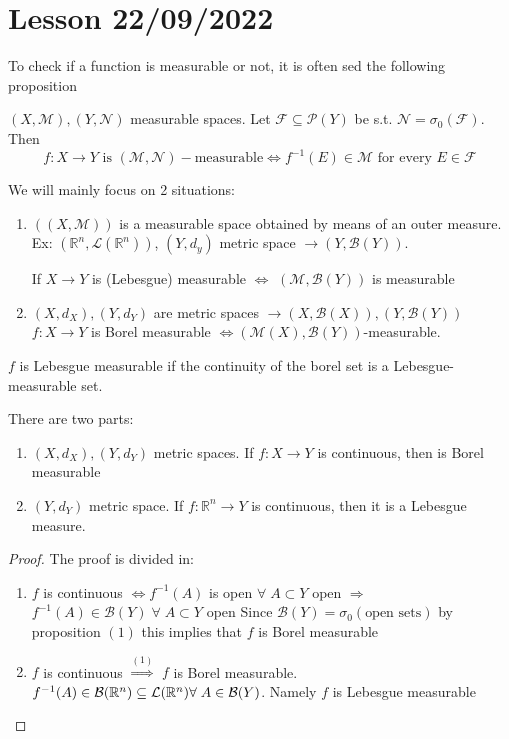\section{Lesson 22/09/2022}
To check if a function is measurable or not, it is often sed the following proposition
\begin{proposition}
    \((X, \mathcal{M}), (Y, \mathcal{N})\) measurable spaces. Let \(\mathcal{F} \subseteq \mathcal{P}(Y)\) be s.t. \(\mathcal{N} = \sigma_0(\mathcal{F})\). Then
    \[
        f: X \to Y \mbox{ is } (\mathcal{M}, \mathcal{N})-\mbox{measurable} \Longleftrightarrow f^{-1}(E) \in \mathcal{M} \mbox{ for every } E \in \mathcal{F}
    \]
\end{proposition}

We will mainly focus on 2 situations:
\begin{enumerate}
    \item  \(((X, \mathcal{M}))\) is a measurable space obtained by means of an outer measure.
    Ex: \((\mathbb{R}^n, \mathcal{L}(\mathbb{R}^n))\), \((Y, d_y)\) metric space \(\to (Y, \mathcal{B}(Y))\). 

    If \(X \to Y\) is (Lebesgue) measurable \(\Longleftrightarrow\) \((\mathcal{M}, \mathcal{B}(Y))\) is measurable
    \item \((X, d_X), (Y, d_Y)\) are metric spaces \(\longrightarrow (X, \mathcal{B}(X)), (Y, \mathcal{B}(Y))\)
    \(f: X \to Y\) is Borel measurable \(\Longleftrightarrow (\mathcal{M}(X), \mathcal{B}(Y)) \)-measurable.
\end{enumerate}
\begin{remark}
     \(f\) is Lebesgue measurable if the continuity of the borel set is a Lebesgue-measurable set.
\end{remark}
\begin{proposition}
    There are two parts:
    \begin{enumerate}
        \item \((X, d_X), (Y, d_Y)\) metric spaces. If \(f:X \to Y\) is continuous, then is Borel measurable
        \item \((Y, d_Y)\) metric space. If \(f:\mathbb{R}^n \to Y\) is continuous, then it is a Lebesgue measure.
    \end{enumerate}
\end{proposition}
\begin{proof}
    The proof is divided in:
    \begin{enumerate}
        \item \(f\) is continuous \(\Longleftrightarrow f^{-1}(A)\) is open \(\forall \; A \subset Y\)
        open \(\Longrightarrow\) \(f^{-1}(A) \in \mathcal{B}(Y) \; \forall \; A \subset Y\) open
        Since \(\mathcal{B}(Y) = \sigma_0(\mbox{open sets})\) by proposition \((1)\) this implies that \(f\) is Borel measurable
        \item \(f\) is continuous \(\overset{(1)}{\Longrightarrow}\) \(f\) is Borel measurable.
        \(f^{-1}(A) \in \mathcal{B}(\mathbb{R}^n) \subseteq \mathcal{L}(\mathbb{R}^n) \forall \; A \in \mathcal{B}(Y)\). Namely \(f\) is Lebesgue measurable
    \end{enumerate}
\end{proof}
